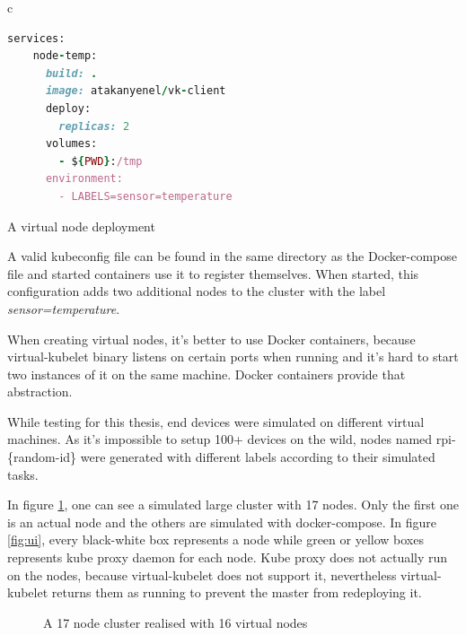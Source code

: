 \begin{code}[htpb]
  \centering
  \begin{tabular}{c}
  \begin{lstlisting}[language=ruby]
    services:
    node-temp:
      build: .
      image: atakanyenel/vk-client
      deploy:
        replicas: 2
      volumes:
        - ${PWD}:/tmp
      environment:
        - LABELS=sensor=temperature
\end{lstlisting}
\end{tabular}
\caption{A virtual node deployment}\label{fig:docker-compose}
\end{code}


A valid kubeconfig file can be found in the same directory as the Docker-compose file and started containers use it to register themselves. When started, this configuration adds two additional nodes to the cluster with the label \textit{sensor=temperature}.

When creating virtual nodes, it's better to use Docker containers, because virtual-kubelet binary listens on certain ports when running and it's hard to start two instances of it on the same machine. Docker containers provide that abstraction.

While testing for this thesis, end devices were simulated on different virtual machines. As it's impossible to setup 100+ devices on the wild, nodes named rpi-\{random-id\} were generated with different labels according to their simulated tasks.

In figure \ref{fig:largecluster}, one can see a simulated large cluster with 17 nodes. Only the first one is an actual node and the others are simulated with docker-compose. In figure \ref{fig:ui}, every black-white box represents a node while green or yellow boxes represents kube proxy daemon for each node. Kube proxy does not actually run on the nodes, because virtual-kubelet does not support it, nevertheless virtual-kubelet returns them as running to prevent the master from redeploying it.
\begin{figure}[htbp]
  \centering
  
  \caption{A 17 node cluster realised with 16 virtual nodes}\label{fig:largecluster}
\end{figure}


